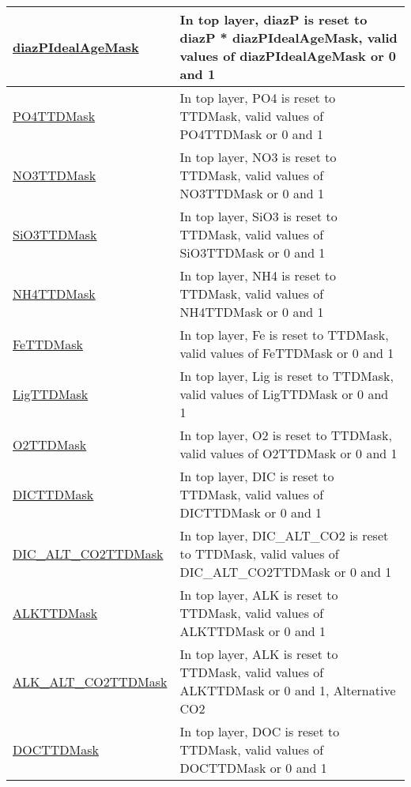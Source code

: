 {\begin{center}
\begin{longtable}{| p{2.0in} | p{4.0in} |}
    \hline
    \hyperref[subsec:var_sec_forcing_diazPIdealAgeMask]{diazPIdealAgeMask} & In top layer, diazP is reset to diazP * diazPIdealAgeMask, valid values of diazPIdealAgeMask or 0 and 1 \\
    \hline
    \hyperref[subsec:var_sec_forcing_PO4TTDMask]{PO4TTDMask} & In top layer, PO4 is reset to TTDMask, valid values of PO4TTDMask or 0 and 1 \\
    \hline
    \hyperref[subsec:var_sec_forcing_NO3TTDMask]{NO3TTDMask} & In top layer, NO3 is reset to TTDMask, valid values of NO3TTDMask or 0 and 1 \\
    \hline
    \hyperref[subsec:var_sec_forcing_SiO3TTDMask]{SiO3TTDMask} & In top layer, SiO3 is reset to TTDMask, valid values of SiO3TTDMask or 0 and 1 \\
    \hline
    \hyperref[subsec:var_sec_forcing_NH4TTDMask]{NH4TTDMask} & In top layer, NH4 is reset to TTDMask, valid values of NH4TTDMask or 0 and 1 \\
    \hline
    \hyperref[subsec:var_sec_forcing_FeTTDMask]{FeTTDMask} & In top layer, Fe is reset to TTDMask, valid values of FeTTDMask or 0 and 1 \\
    \hline
    \hyperref[subsec:var_sec_forcing_LigTTDMask]{LigTTDMask} & In top layer, Lig is reset to TTDMask, valid values of LigTTDMask or 0 and 1 \\
    \hline
    \hyperref[subsec:var_sec_forcing_O2TTDMask]{O2TTDMask} & In top layer, O2 is reset to TTDMask, valid values of O2TTDMask or 0 and 1 \\
    \hline
    \hyperref[subsec:var_sec_forcing_DICTTDMask]{DICTTDMask} & In top layer, DIC is reset to TTDMask, valid values of DICTTDMask or 0 and 1 \\
    \hline
    \hyperref[subsec:var_sec_forcing_DIC_ALT_CO2TTDMask]{DIC\_ALT\_CO2TTDMask} & In top layer, DIC\_ALT\_CO2 is reset to TTDMask, valid values of DIC\_ALT\_CO2TTDMask or 0 and 1 \\
    \hline
    \hyperref[subsec:var_sec_forcing_ALKTTDMask]{ALKTTDMask} & In top layer, ALK is reset to TTDMask, valid values of ALKTTDMask or 0 and 1 \\
    \hline
    \hyperref[subsec:var_sec_forcing_ALK_ALT_CO2TTDMask]{ALK\_ALT\_CO2TTDMask} & In top layer, ALK is reset to TTDMask, valid values of ALKTTDMask or 0 and 1, Alternative CO2 \\
    \hline
    \hyperref[subsec:var_sec_forcing_DOCTTDMask]{DOCTTDMask} & In top layer, DOC is reset to TTDMask, valid values of DOCTTDMask or 0 and 1 \\

\end{longtable}
\end{center}}
